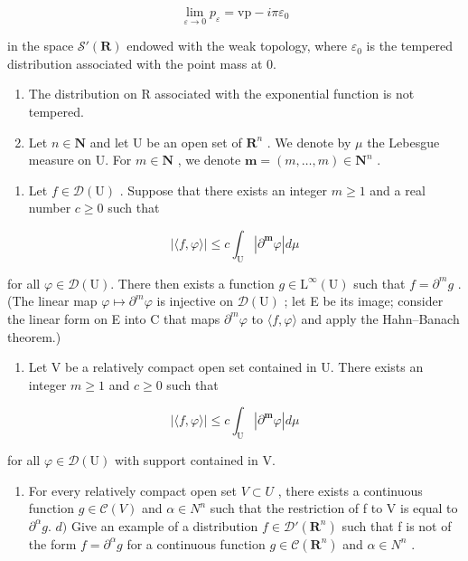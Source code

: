\[
\lim _ {\varepsilon \to 0} p _ {\varepsilon} = \mathrm{vp} - i \pi \varepsilon_ {0}
\]

in the space \(\mathcal{S}'(\mathbf{R})\) endowed with the weak topology, where \(\varepsilon_0\) is the tempered distribution associated with the point mass at 0.

\begin{enumerate}
\def\labelenumi{\arabic{enumi})}
\setcounter{enumi}{21}
\item
  The distribution on R associated with the exponential function is not tempered.
\item
  Let \(n \in \mathbf{N}\) and let U be an open set of \(\mathbf{R}^n\) . We denote by \(\mu\) the Lebesgue measure on U. For \(m \in \mathbf{N}\) , we denote \(\boldsymbol{m} = (m, \ldots, m) \in \mathbf{N}^n\) .
\end{enumerate}

\begin{enumerate}
\def\labelenumi{\alph{enumi})}
\tightlist
\item
  Let \(f \in \mathcal{D}(\mathrm{U})\) . Suppose that there exists an integer \(m \geqslant 1\) and a real number \(c \geqslant 0\) such that
\end{enumerate}

\[
| \langle f, \varphi \rangle | \leqslant c \int_ {\mathrm{U}} | \partial^ {\boldsymbol {m}} \varphi | d \mu
\]

for all \(\varphi\in\mathcal{D}(\mathrm{U})\). There then exists a function \(g\in\mathrm{L}^{\infty}(\mathrm{U})\) such that \(f=\partial^{m}g\) . (The linear map \(\varphi\mapsto\partial^{m}\varphi\) is injective on \(\mathcal{D}(\mathrm{U})\) ; let E be its image; consider the linear form on E into C that maps \(\partial^{m}\varphi\) to \(\langle f,\varphi\rangle\) and apply the Hahn--Banach theorem.)

\begin{enumerate}
\def\labelenumi{\alph{enumi})}
\setcounter{enumi}{1}
\tightlist
\item
  Let V be a relatively compact open set contained in U. There exists an integer \(m \geqslant 1\) and \(c \geqslant 0\) such that
\end{enumerate}

\[
| \langle f, \varphi \rangle | \leqslant c \int_ {\mathrm{U}} | \partial^ {\boldsymbol {m}} \varphi | d \mu
\]

for all \(\varphi\in\mathcal{D}(\mathrm{U})\) with support contained in V.

\begin{enumerate}
\def\labelenumi{\alph{enumi})}
\setcounter{enumi}{2}
\tightlist
\item
  For every relatively compact open set \(V \subset U\) , there exists a continuous function \(g \in \mathcal{C}(V)\) and \(\alpha \in N^{n}\) such that the restriction of f to V is equal to \(\partial^{\alpha}g\). \(d)\) Give an example of a distribution \(f \in \mathcal{D}'(\mathbf{R}^{n})\) such that f is not of the form \(f = \partial^{\alpha}g\) for a continuous function \(g \in \mathcal{C}(\mathbf{R}^{n})\) and \(\alpha \in N^{n}\) .
\end{enumerate}

